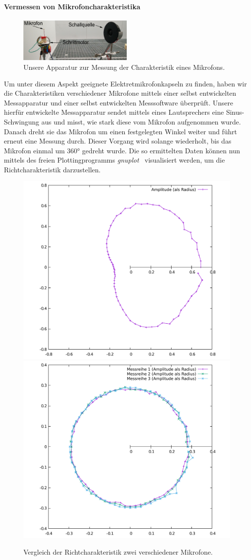 \paragraph{Vermessen von Mikrofoncharakteristika}
\begin{figure}
	\centering
	\includegraphics[width=0.5\textwidth]{img/chara_mess}
	\caption{Unsere Apparatur zur Messung der Charakteristik eines Mikrofons.}
\end{figure}
Um unter diesem Aspekt geeignete Elektretmikrofonkapseln zu finden, haben wir die Charakteristiken verschiedener Mikrofone mittels einer selbst entwickelten Messapparatur und einer selbst entwickelten Messsoftware überprüft. Unsere hierfür entwickelte Messapparatur sendet mittels eines Lautsprechers eine Sinus-Schwingung aus und misst, wie stark diese vom Mikrofon aufgenommen wurde. Danach dreht sie das Mikrofon um einen festgelegten Winkel weiter und führt erneut eine Messung durch. Dieser Vorgang wird solange wiederholt, bis das Mikrofon einmal um \ang{360} gedreht wurde.
Die so ermittelten Daten können nun mittels des freien Plottingprogramms \textit{gnuplot}~\cite{Gnuplot} visualisiert werden, um die Richtcharakteristik darzustellen.
\begin{figure}[H]
    \centering
    \includegraphics[width=0.45\linewidth]{img/badMic}
    \includegraphics[width=0.45\linewidth]{img/goodMic}
    \caption{Vergleich der Richtcharakteristik zwei verschiedener Mikrofone.\label{fig:caracter}}
\end{figure}
